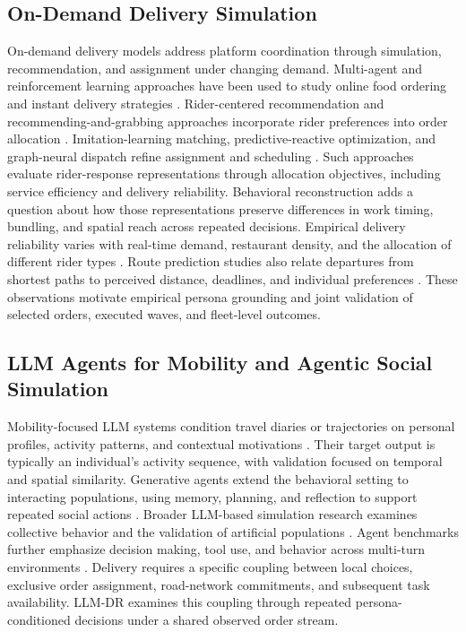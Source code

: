\documentclass[letterpaper,journal]{IEEEtran}
\begin{document}
\subsection{On-Demand Delivery Simulation}
On-demand delivery models address platform coordination through simulation, recommendation, and assignment under changing demand. Multi-agent and reinforcement learning approaches have been used to study online food ordering and instant delivery strategies \cite{jinSimulationBasedScheduling2019,zouSimulationOnlineFood2023,zouOnlineFoodOrdering2022}. Rider-centered recommendation and recommending-and-grabbing approaches incorporate rider preferences into order allocation \cite{wangOnlineDeepReinforcement2023,wangRecommendingGrabbing2023}. Imitation-learning matching, predictive-reactive optimization, and graph-neural dispatch refine assignment and scheduling \cite{chenImitationLearningEnhanced2022,zhengPredictiveReactiveOptimization2023,chenOrderDispatchingGNN2024}. Such approaches evaluate rider-response representations through allocation objectives, including service efficiency and delivery reliability. Behavioral reconstruction adds a question about how those representations preserve differences in work timing, bundling, and spatial reach across repeated decisions. Empirical delivery reliability varies with real-time demand, restaurant density, and the allocation of different rider types \cite{liRealtimeDemandsRestaurant2025}. Route prediction studies also relate departures from shortest paths to perceived distance, deadlines, and individual preferences \cite{zhangRoutePredictionInstant2019}. These observations motivate empirical persona grounding and joint validation of selected orders, executed waves, and fleet-level outcomes.

\subsection{LLM Agents for Mobility and Agentic Social Simulation}
Mobility-focused LLM systems condition travel diaries or trajectories on personal profiles, activity patterns, and contextual motivations \cite{wangLargeLanguageModels2024,juTrajLLMModularLLMEnhanced2025,liBeMoreReal2024,shaoChainofPlannedBehaviourWorkflowElicits2024}. Their target output is typically an individual's activity sequence, with validation focused on temporal and spatial similarity. Generative agents extend the behavioral setting to interacting populations, using memory, planning, and reflection to support repeated social actions \cite{parkGenerativeAgentsInteractive2023}. Broader LLM-based simulation research examines collective behavior and the validation of artificial populations \cite{mouIndividualSocietySurvey2024,gaoLargeLanguageModelsEmpowered2024,adornettoGenerativeAgentsAgent2025}. Agent benchmarks further emphasize decision making, tool use, and behavior across multi-turn environments \cite{liuAgentBenchEvaluating2024,changSurveyEvaluationLLMs2024}. Delivery requires a specific coupling between local choices, exclusive order assignment, road-network commitments, and subsequent task availability. LLM-DR examines this coupling through repeated persona-conditioned decisions under a shared observed order stream.
\end{document}
